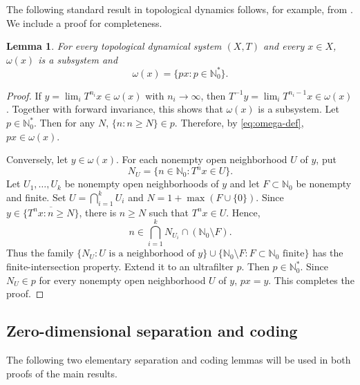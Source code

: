 \documentclass[reqno,12pt]{amsart}
\newtheorem{lemma}[thm]{Lemma}
\newcommand{\Nzero}{\mathbb N_0}
\newcommand{\Nstar}{\Nzero^{*}}
\numberwithin{equation}{section}
\begin{document}
The following standard result in topological dynamics follows, for example,
from \cite[pp.~38--40]{Blass}. We include a proof for completeness.

\begin{lemma}\label{lem:omega-ultrafilter}
	For every topological dynamical system $(X,T)$ and every $x\in X$,
	$\omega(x)$ is a subsystem and
	\begin{equation}\label{eq:omega-ultrafilter}
	\omega(x)=\{px:p\in\Nstar\}.
	\end{equation}
\end{lemma}

\begin{proof}
	If $y=\lim_iT^{n_i}x\in\omega(x)$ with $n_i\to\infty$, then
	$T^{-1}y=\lim_iT^{n_i-1}x\in\omega(x)$. Together with forward
	invariance, this shows that $\omega(x)$ is a subsystem. Let
	$p\in\Nstar$. Then for any $N$, $\{n:n\geq N\}\in p$. Therefore, by \eqref{eq:omega-def},
	$px\in\omega(x)$.
	
	Conversely, let $y\in\omega(x)$.  For each nonempty open neighborhood $U$ of $y$, put
	\[
	N_U=\{n\in\Nzero:T^nx\in U\}.
	\]
	Let $U_1,\ldots,U_k$ be nonempty open neighborhoods of $y$ and let
	$F\subset\Nzero$ be nonempty and finite.  Set
	$U=\bigcap_{i=1}^k U_i$ and $N=1+\max(F\cup\{0\})$.  Since
	$y\in\overline{\{T^nx:n\geq N\}}$, there is $n\geq N$ such that
	$T^nx\in U$.  Hence,
	\[
	n\in\bigcap_{i=1}^kN_{U_i}\cap(\Nzero\setminus F).
	\]
	Thus the family
	$
	\{N_U:U\text{ is a neighborhood of }y\}
	\cup
	\{\Nzero\setminus F:F\subset\Nzero\text{ finite}\}
	$
	has the finite-intersection property.  Extend it to an ultrafilter $p$.
	Then $p\in\Nstar$.
	Since $N_U\in p$ for every nonempty open neighborhood $U$ of $y$, $px=y$.
	This completes the proof.
\end{proof}

\subsection{Zero-dimensional separation and coding}

The following two elementary separation and coding lemmas will be used in
both proofs of the main results.
\end{document}
